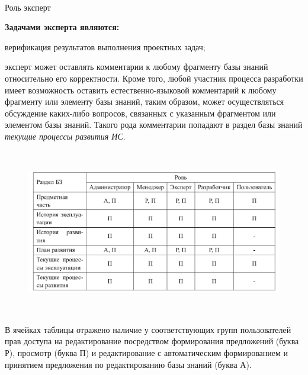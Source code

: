 \begin{frame}{\\Роль эксперт}
	\topline
	\justifying
	\begin{SCn}
	\end{SCn}
	\textbf{Задачами эксперта являются:}
	\begin{textitemize}
		\item верификация результатов выполнения проектных задач;
		\item эксперт может оставлять комментарии к любому фрагменту базы знаний относительно его корректности. Кроме того, любой участник процесса разработки имеет возможность оставить естественно-языковой комментарий к любому фрагменту или элементу базы знаний, таким образом, может осуществляться обсуждение каких-либо вопросов, связанных с указанным фрагментом или элементом базы знаний. Такого рода комментарии попадают в раздел базы знаний \textit{текущие процессы развития ИС}.
	\end{textitemize}
\end{frame}

\begin{frame}{\\}
	\topline
	\justifying
	
	\begin{SCn}
		\begin{figure}[H]
			\includegraphics[scale=0.3]{./figures/sd_kb_develop_methods/table.png}
		\end{figure}
	\end{SCn}
\end{frame}

\begin{frame}{\\}
	\topline
	\justifying
	
	\begin{SCn}
		В ячейках таблицы отражено наличие	у соответствующих групп пользователей прав доступа на редактирование посредством формирования предложений (буква Р), просмотр (буква П) и редактирование с автоматическим формированием и принятием предложения по редактированию базы знаний (буква А).
	\end{SCn}
\end{frame}

